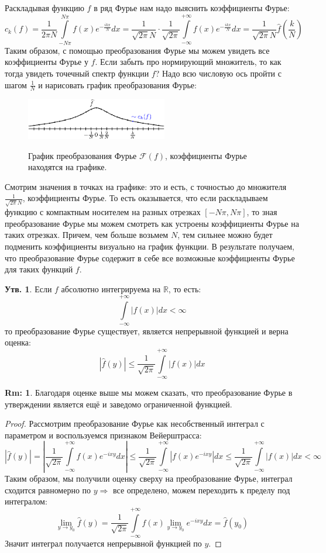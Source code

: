 \documentclass[12pt]{article}
\newcommand{\MR}{\mathbb{R}}
\theoremstyle{definition}
\newtheorem{rem}{Rm:}
\newtheorem{prop}{Утв.}
\newcommand{\ddint}[2]{\displaystyle\int\limits_{#1}^{#2}}
\newcommand{\wht}[1]{\widehat{#1}}
\newcommand{\fourt}[1]{\mathcal{F}\left(#1\right)}
\begin{document}
Раскладывая функцию $f$ в ряд Фурье нам надо выяснить коэффициенты Фурье:
$$
	c_k(f) = \dfrac{1}{2\pi N} \ddint{-N\pi}{N\pi}f(x)e^{-\tfrac{ik x}{N}}dx = \dfrac{1}{\sqrt{2\pi} N}{\cdot}\dfrac{1}{\sqrt{2\pi}}\ddint{-\infty}{+\infty}f(x)e^{-\tfrac{ik x}{N}}dx = \dfrac{1}{\sqrt{2\pi} N}\wht{f}\left(\dfrac{k}{N}\right)
$$
Таким образом, с помощью преобразования Фурье мы можем увидеть все коэффициенты Фурье у $f$. Если забыть про нормирующий множитель, то как тогда увидеть точечный спектр функции $f$? Надо всю числовую ось пройти с шагом $\tfrac{1}{N}$ и нарисовать график преобразования Фурье:
\begin{figure}[H]
	\centering
	\includegraphics[width=0.55\textwidth]{MA3L29_2.eps}
	\label{MA3L29_2}
	\caption{График преобразования Фурье $\fourt{f}$, коэффициенты Фурье находятся на графике.}
	\label{fig: Преобразоване Фурье}
\end{figure}
Смотрим значения в точках на графике: это и есть, с точностью до множителя $\tfrac{1}{\sqrt{2\pi}N}$, коэффициенты Фурье. То есть оказывается, что если раскладываем функцию с компактным носителем на разных отрезках $[-N\pi,N\pi]$, то зная преобразование Фурье мы можем смотреть как устроены коэффициенты Фурье на таких отрезках.
Причем, чем больше возьмем $N$, тем сильнее можно будет подменить коэффициенты визуально на график функции. В результате получаем, что преобразование Фурье содержит в себе все возможные коэффициенты Фурье для таких функций $f$.

\begin{prop}
	Если $f$ абсолютно интегрируема на $\MR$, то есть:
	$$
		\ddint{-\infty}{+\infty}|f(x)|dx < \infty
	$$
	то преобразование Фурье существует, является непрерывной функцией и верна оценка:
	$$
		\left|\wht{f}(y)\right| \leq \dfrac{1}{\sqrt{2\pi}}\ddint{-\infty}{+\infty}|f(x)|dx
	$$
\end{prop}
\begin{rem}
	Благодаря оценке выше мы можем сказать, что преобразование Фурье в утверждении является ещё и заведомо ограниченной функцией.
\end{rem}
\begin{proof}
	Рассмотрим преобразование Фурье как несобственный интеграл с параметром и воспользуемся признаком Вейерштрасса:
	$$
		\left|\widehat{f}(y)\right| = \left|\dfrac{1}{\sqrt{2\pi}}\ddint{-\infty}{+\infty}f(x)e^{-ixy}dx\right| \leq \dfrac{1}{\sqrt{2\pi}}\ddint{-\infty}{+\infty}\left|f(x)e^{-ixy}\right|dx \leq \dfrac{1}{\sqrt{2\pi}}\ddint{-\infty}{+\infty}\left|f(x)\right|dx < \infty
	$$
	Таким образом, мы получили оценку сверху на преобразование Фурье, интеграл сходится равномерно по $y \Rightarrow$ все определено, можем переходить к пределу под интегралом: 
	$$
		\lim\limits_{y \to y_0}\wht{f}(y) = \dfrac{1}{\sqrt{2\pi}}\ddint{-\infty}{+\infty}f(x) \lim\limits_{y \to y_0} e^{-ixy}dx = \wht{f}(y_0)
	$$
	Значит интеграл получается непрерывной функцией по $y$. 
\end{proof}
\end{document}
